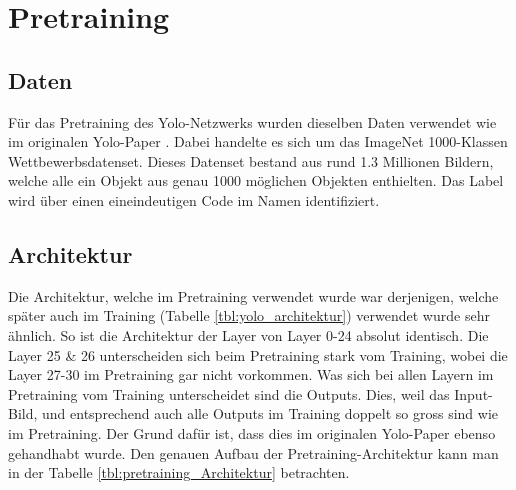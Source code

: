 \newpage
\section{Pretraining}

\subsection{Daten}
Für das Pretraining des Yolo-Netzwerks wurden dieselben Daten verwendet wie im originalen Yolo-Paper \cite{yolo}.
Dabei handelte es sich um das ImageNet 1000-Klassen Wettbewerbsdatenset.
Dieses Datenset bestand aus rund 1.3 Millionen Bildern, welche alle ein Objekt aus genau 1000 möglichen Objekten enthielten.
Das Label wird über einen eineindeutigen Code im Namen identifiziert.
\subsection{Architektur}
Die Architektur, welche im Pretraining verwendet wurde war derjenigen, welche später auch im Training (Tabelle \ref{tbl:yolo_architektur}) verwendet wurde sehr ähnlich.
So ist die Architektur der Layer von Layer 0-24 absolut identisch. 
Die Layer 25 \& 26 unterscheiden sich beim Pretraining stark vom Training, wobei die Layer 27-30 im Pretraining gar nicht vorkommen.
Was sich bei allen Layern im Pretraining vom Training unterscheidet sind die Outputs. 
Dies, weil das Input-Bild, und entsprechend auch alle Outputs im Training doppelt so gross sind wie im Pretraining. 
Der Grund dafür ist, dass dies im originalen Yolo-Paper \cite{yolo} ebenso gehandhabt wurde.
Den genauen Aufbau der Pretraining-Architektur kann man in der Tabelle \ref{tbl:pretraining_Architektur} betrachten.
